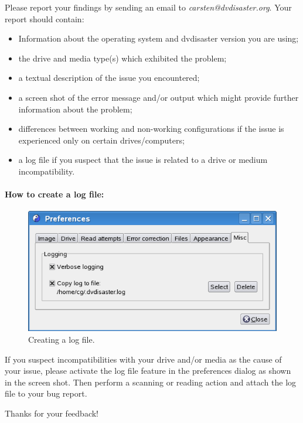 Please report your findings by sending an email to {\em carsten@dvdisaster.org}.
Your report should contain:

\begin{itemize}
\item Information about the operating system and dvdisaster version you are using;
\item the drive and media type(s) which exhibited the problem;
\item a textual description of the issue you encountered;
\item a screen shot of the error message and/or output which might provide further information about the problem;
\item differences between working and non-working configurations if the issue is experienced only on certain drives/computers;
\item a log file if you suspect that the issue is related to a drive or medium incompatibility.
\end{itemize}

\paragraph{How to create a log file:}\quad
\label{reporting-defects-log}
\medskip

\begin{figure}[h]
\centerline{\includegraphics[width=\textwidth]{screenshots/activate-logfile.png}}
\caption{Creating a log file.}  
\label{defect-prefs-log}
\end{figure}

If you suspect incompatibilities with your drive and/or media as the cause of your
issue, please activate the log file feature in the preferences dialog as shown in
the screen shot. Then perform a scanning or reading action and attach the log file
to your bug report.

\bigskip

Thanks for your feedback!
